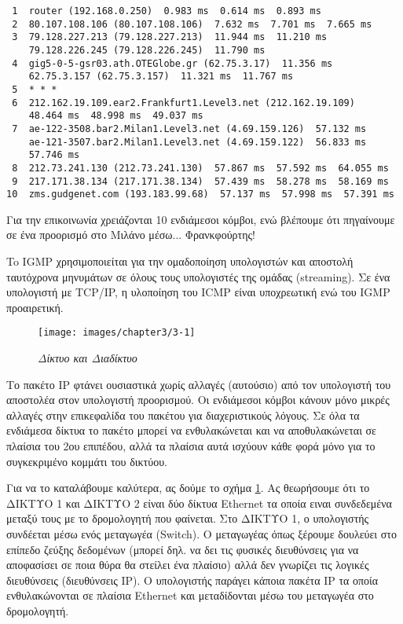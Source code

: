 \begin{inthebox}
\begin{verbatim}
 1  router (192.168.0.250)  0.983 ms  0.614 ms  0.893 ms
 2  80.107.108.106 (80.107.108.106)  7.632 ms  7.701 ms  7.665 ms
 3  79.128.227.213 (79.128.227.213)  11.944 ms  11.210 ms
    79.128.226.245 (79.128.226.245)  11.790 ms
 4  gig5-0-5-gsr03.ath.OTEGlobe.gr (62.75.3.17)  11.356 ms
    62.75.3.157 (62.75.3.157)  11.321 ms  11.767 ms
 5  * * *
 6  212.162.19.109.ear2.Frankfurt1.Level3.net (212.162.19.109) 
    48.464 ms  48.998 ms  49.037 ms
 7  ae-122-3508.bar2.Milan1.Level3.net (4.69.159.126)  57.132 ms
    ae-121-3507.bar2.Milan1.Level3.net (4.69.159.122)  56.833 ms  
    57.746 ms
 8  212.73.241.130 (212.73.241.130)  57.867 ms  57.592 ms  64.055 ms
 9  217.171.38.134 (217.171.38.134)  57.439 ms  58.278 ms  58.169 ms
10  zms.gudgenet.com (193.183.99.68)  57.137 ms  57.998 ms  57.391 ms
\end{verbatim}
\normalsize
Για την επικοινωνία χρειάζονται 10 ενδιάμεσοι κόμβοι, ενώ βλέπουμε ότι πηγαίνουμε σε ένα προορισμό στο Μιλάνο μέσω... Φρανκφούρτης!\\
\end{inthebox}

To IGMP χρησιμοποιείται για την ομαδοποίηση υπολογιστών και αποστολή ταυτόχρονα μηνυμάτων σε όλους τους υπολογιστές της ομάδας (streaming). Σε ένα υπολογιστή με TCP/IP, η υλοποίηση του ICMP είναι υποχρεωτική ενώ του IGMP προαιρετική.

\begin{figure}[!ht]
  \centering
  \texttt{[image: images/chapter3/3-1]}
  \caption {\textsl{Δίκτυο και Διαδίκτυο}}
  \label{3-1}
\end{figure}

Το πακέτο IP φτάνει ουσιαστικά χωρίς αλλαγές (αυτούσιο) από τον υπολογιστή του αποστολέα στον υπολογιστή προορισμού. Οι ενδιάμεσοι κόμβοι κάνουν μόνο μικρές αλλαγές στην επικεφαλίδα του πακέτου για διαχεριστικούς λόγους. Σε όλα τα ενδιάμεσα δίκτυα το πακέτο μπορεί να ενθυλακώνεται και να αποθυλακώνεται σε πλαίσια του 2ου επιπέδου, αλλά τα πλαίσια αυτά ισχύουν κάθε φορά μόνο για το συγκεκριμένο κομμάτι του δικτύου.

Για να το καταλάβουμε καλύτερα, ας δούμε το σχήμα \ref{3-1}. Ας θεωρήσουμε ότι το ΔΙΚΤΥΟ 1 και ΔΙΚΤΥΟ 2 είναι δύο δίκτυα Ethernet τα οποία ειναι συνδεδεμένα μεταξύ τους με το δρομολογητή που φαίνεται.  Στο ΔΙΚΤΥΟ 1, ο υπολογιστής συνδέεται μέσω ενός μεταγωγέα (Switch). Ο μεταγωγέας όπως ξέρουμε δουλεύει στο επίπεδο ζεύξης δεδομένων (μπορεί δηλ. να δει τις φυσικές διευθύνσεις για να αποφασίσει σε ποια θύρα θα στείλει ένα πλαίσιο) αλλά δεν γνωρίζει τις λογικές διευθύνσεις (διευθύνσεις IP). Ο υπολογιστής παράγει κάποια πακέτα IP τα οποία ενθυλακώνονται σε πλαίσια Ethernet και μεταδίδονται μέσω του μεταγωγέα στο δρομολογητή.

